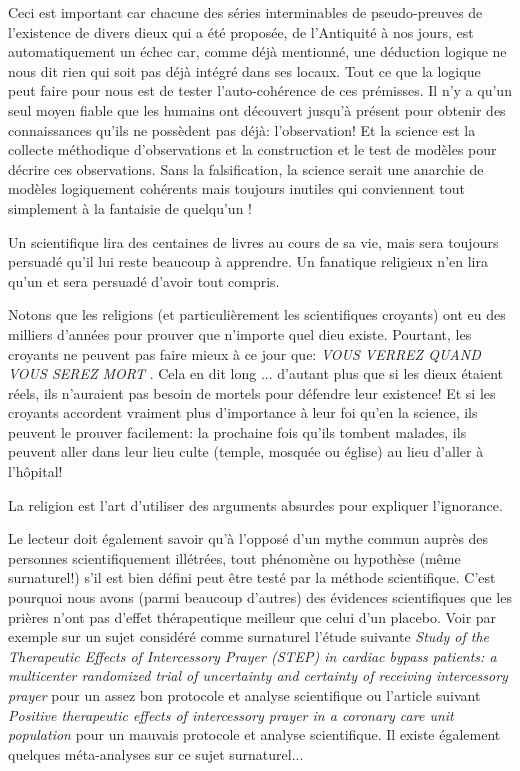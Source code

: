 	Ceci est important car chacune des séries interminables de pseudo-preuves de l'existence de divers dieux qui a été proposée, de l'Antiquité à nos jours, est automatiquement un échec car, comme déjà mentionné, une déduction logique ne nous dit rien qui soit pas déjà intégré dans ses locaux. Tout ce que la logique peut faire pour nous est de tester l'auto-cohérence de ces prémisses. Il n'y a qu'un seul moyen fiable que les humains ont découvert jusqu'à présent pour obtenir des connaissances qu'ils ne possèdent pas déjà: l'observation! Et la science est la collecte méthodique d'observations et la construction et le test de modèles pour décrire ces observations. Sans la falsification, la science serait une anarchie de modèles logiquement cohérents mais toujours inutiles qui conviennent tout simplement à la fantaisie de quelqu'un !
	
	\begin{fquote}Un scientifique lira des centaines de livres au cours de sa vie, mais sera toujours persuadé qu'il lui reste beaucoup à apprendre. Un fanatique religieux n'en lira qu'un et sera persuadé d'avoir tout compris.
 	\end{fquote}
	
	Notons que les religions (et particulièrement les scientifiques croyants) ont eu des milliers d'années pour prouver que n'importe quel dieu existe. Pourtant, les croyants ne peuvent pas faire mieux à ce jour que: \og \textit{VOUS VERREZ QUAND VOUS SEREZ MORT} \fg{}. Cela en dit long ... d'autant plus que si les dieux étaient réels, ils n'auraient pas besoin de mortels pour défendre leur existence! Et si les croyants accordent vraiment plus d'importance à leur foi qu'en la science, ils peuvent le prouver facilement: la prochaine fois qu'ils tombent malades, ils peuvent aller dans leur lieu culte (temple, mosquée ou église) au lieu d'aller à l'hôpital!
	
	\begin{fquote}La religion est l'art d'utiliser des arguments absurdes pour expliquer l'ignorance.
 	\end{fquote}
	
	Le lecteur doit également savoir qu'à l'opposé d'un mythe commun auprès des personnes scientifiquement illétrées, tout phénomène ou hypothèse (même surnaturel!) s'il est bien défini peut être testé par la méthode scientifique. C'est pourquoi nous avons (parmi beaucoup d'autres) des évidences scientifiques que les prières n'ont pas d'effet thérapeutique meilleur que celui d'un placebo. Voir par exemple sur un sujet considéré comme surnaturel l'étude suivante \textit{Study of the Therapeutic Effects of Intercessory Prayer (STEP) in cardiac bypass patients: a multicenter randomized trial of uncertainty and certainty of receiving intercessory prayer} \cite{benson2006study} pour un assez bon protocole et analyse scientifique ou l'article suivant \textit{Positive therapeutic effects of intercessory prayer in a coronary care unit population} \cite{byrd1988positive} pour un mauvais protocole et analyse scientifique. Il existe également quelques méta-analyses sur ce sujet surnaturel...
	
